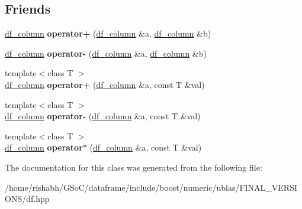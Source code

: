 \subsection*{Friends}
\begin{DoxyCompactItemize}
\item 
\hyperlink{classboost_1_1numeric_1_1ublas_1_1df__column}{df\+\_\+column} {\bfseries operator+} (\hyperlink{classboost_1_1numeric_1_1ublas_1_1df__column}{df\+\_\+column} \&a, \hyperlink{classboost_1_1numeric_1_1ublas_1_1df__column}{df\+\_\+column} \&b)\hypertarget{classboost_1_1numeric_1_1ublas_1_1df__column_af49a160a88867a3857fa62054750742d}{}\label{classboost_1_1numeric_1_1ublas_1_1df__column_af49a160a88867a3857fa62054750742d}

\item 
\hyperlink{classboost_1_1numeric_1_1ublas_1_1df__column}{df\+\_\+column} {\bfseries operator-\/} (\hyperlink{classboost_1_1numeric_1_1ublas_1_1df__column}{df\+\_\+column} \&a, \hyperlink{classboost_1_1numeric_1_1ublas_1_1df__column}{df\+\_\+column} \&b)\hypertarget{classboost_1_1numeric_1_1ublas_1_1df__column_a8bffb7e6810852b8f01d0794d85e0298}{}\label{classboost_1_1numeric_1_1ublas_1_1df__column_a8bffb7e6810852b8f01d0794d85e0298}

\item 
{\footnotesize template$<$class T $>$ }\\\hyperlink{classboost_1_1numeric_1_1ublas_1_1df__column}{df\+\_\+column} {\bfseries operator+} (\hyperlink{classboost_1_1numeric_1_1ublas_1_1df__column}{df\+\_\+column} \&a, const T \&val)\hypertarget{classboost_1_1numeric_1_1ublas_1_1df__column_a5a64459c6a2aa15589c8c729341d3760}{}\label{classboost_1_1numeric_1_1ublas_1_1df__column_a5a64459c6a2aa15589c8c729341d3760}

\item 
{\footnotesize template$<$class T $>$ }\\\hyperlink{classboost_1_1numeric_1_1ublas_1_1df__column}{df\+\_\+column} {\bfseries operator-\/} (\hyperlink{classboost_1_1numeric_1_1ublas_1_1df__column}{df\+\_\+column} \&a, const T \&val)\hypertarget{classboost_1_1numeric_1_1ublas_1_1df__column_a6161de113fac68f0aa29fd02411ef024}{}\label{classboost_1_1numeric_1_1ublas_1_1df__column_a6161de113fac68f0aa29fd02411ef024}

\item 
{\footnotesize template$<$class T $>$ }\\\hyperlink{classboost_1_1numeric_1_1ublas_1_1df__column}{df\+\_\+column} {\bfseries operator$\ast$} (\hyperlink{classboost_1_1numeric_1_1ublas_1_1df__column}{df\+\_\+column} \&a, const T \&val)\hypertarget{classboost_1_1numeric_1_1ublas_1_1df__column_affcb489c3bc406669e8b88b3490fdec0}{}\label{classboost_1_1numeric_1_1ublas_1_1df__column_affcb489c3bc406669e8b88b3490fdec0}

\end{DoxyCompactItemize}


The documentation for this class was generated from the following file\+:\begin{DoxyCompactItemize}
\item 
/home/rishabh/\+G\+So\+C/dataframe/include/boost/numeric/ublas/\+F\+I\+N\+A\+L\+\_\+\+V\+E\+R\+S\+I\+O\+N\+S/df.\+hpp\end{DoxyCompactItemize}
